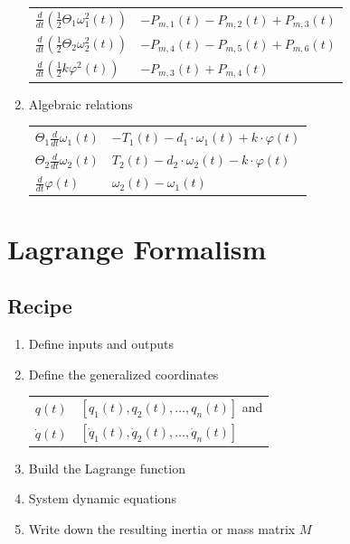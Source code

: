 \documentclass[10pt,a4paper]{scrartcl}
\begin{document}
\begin{multicols*}{3}
\begin{enumerate}
\vspace{3ex}

\begin{tabular}{l@{ = }l}
$\frac{d}{dt}\left(\frac{1}{2}\Theta_1\omega_1^2(t)\right)$&$-P_{m,1}(t)-P_{m,2}(t)+P_{m,3}(t)$\\
$\frac{d}{dt}\left(\frac{1}{2}\Theta_2\omega_2^2(t)\right)$&$-P_{m,4}(t)-P_{m,5}(t)+P_{m,6}(t)$\\
$\frac{d}{dt}\left(\frac{1}{2}k\varphi^2(t)\right)$&$-P_{m,3}(t)+P_{m,4}(t)$
\end{tabular}
\item Algebraic relations

\begin{tabular}{l@{ = }l}
$\Theta_1\frac{d}{dt} \omega_1(t)$&$-T_1(t)-d_1\cdot\omega_1(t)+k\cdot\varphi(t)$\\
$\Theta_2\frac{d}{dt}\omega_2(t)$&$T_2(t)-d_2\cdot\omega_2(t)-k\cdot\varphi(t)$\\
$\frac{d}{dt}\varphi(t)$&$\omega_2(t)-\omega_1(t)$
\end{tabular}
\end{enumerate}


\vfill
\null
\columnbreak

\section{Lagrange Formalism}

\subsection{Recipe}

\begin{enumerate}
\item Define inputs and outputs
\item Define the generalized coordinates

\begin{tabular}{l@{ = }l}
$q(t)$&$[q_1(t),q_2(t),\ldots,q_n(t)]$ and\\
$\dot{q}(t)$&$[\dot{q}_1(t),\dot{q}_2(t),\ldots,\dot{q}_n(t)]$
\end{tabular}
\item Build the Lagrange function
\item System dynamic equations
\item Write down the resulting inertia or mass matrix $M$
\end{enumerate}


\end{multicols*}
\end{document}
